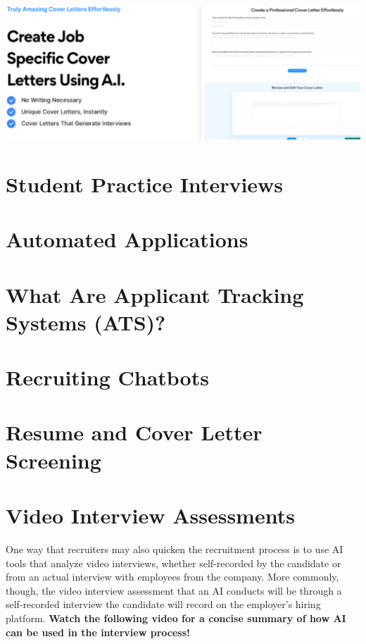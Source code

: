 \documentclass[
]{book}
\begin{document}
\includegraphics[width=6.80208in,height=\textheight]{coverlettsimpleai pic.png}

\hypertarget{student-practice-interviews}{%
\chapter{Student Practice Interviews}\label{student-practice-interviews}}

\hypertarget{automated-applications}{%
\chapter{Automated Applications}\label{automated-applications}}

\hypertarget{what-are-applicant-tracking-systems-ats}{%
\chapter{What Are Applicant Tracking Systems (ATS)?}\label{what-are-applicant-tracking-systems-ats}}

\hypertarget{recruiting-chatbots}{%
\chapter{Recruiting Chatbots}\label{recruiting-chatbots}}

\hypertarget{resume-and-cover-letter-screening}{%
\chapter{Resume and Cover Letter Screening}\label{resume-and-cover-letter-screening}}

\hypertarget{video-interview-assessments}{%
\chapter{Video Interview Assessments}\label{video-interview-assessments}}

One way that recruiters may also quicken the recruitment process is to use AI tools that analyze video interviews, whether self-recorded by the candidate or from an actual interview with employees from the company. More commonly, though, the video interview assessment that an AI conducts will be through a self-recorded interview the candidate will record on the employer's hiring platform. \textbf{Watch the following video for a concise summary of how AI can be used in the interview process!}
\end{document}
